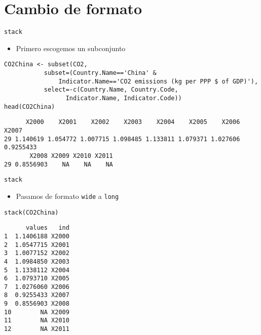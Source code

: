 \documentclass[xcolor={usenames,svgnames,dvipsnames}]{beamer}
\begin{document}
\section{Cambio de formato}
\label{sec-4}
\begin{frame}[fragile,label=sec-4-1]{\texttt{stack}}
 \begin{itemize}
\item Primero escogemos un subconjunto
\end{itemize}
\lstset{language=R,numbers=none}
\begin{lstlisting}
CO2China <- subset(CO2,
		   subset=(Country.Name=='China' &
			   Indicator.Name=='CO2 emissions (kg per PPP $ of GDP)'),
		   select=-c(Country.Name, Country.Code,
			     Indicator.Name, Indicator.Code))
head(CO2China)
\end{lstlisting}

\begin{verbatim}
      X2000    X2001    X2002    X2003    X2004    X2005    X2006     X2007
29 1.140619 1.054772 1.007715 1.098485 1.133811 1.079371 1.027606 0.9255433
       X2008 X2009 X2010 X2011
29 0.8556903    NA    NA    NA
\end{verbatim}
\end{frame}
\begin{frame}[fragile,label=sec-4-2]{\texttt{stack}}
 \begin{itemize}
\item Pasamos de formato \texttt{wide} a \texttt{long}
\end{itemize}
\lstset{language=R,numbers=none}
\begin{lstlisting}
stack(CO2China)
\end{lstlisting}

\begin{verbatim}
      values   ind
1  1.1406188 X2000
2  1.0547715 X2001
3  1.0077152 X2002
4  1.0984850 X2003
5  1.1338112 X2004
6  1.0793710 X2005
7  1.0276060 X2006
8  0.9255433 X2007
9  0.8556903 X2008
10        NA X2009
11        NA X2010
12        NA X2011
\end{verbatim}
\end{frame}
\end{document}
